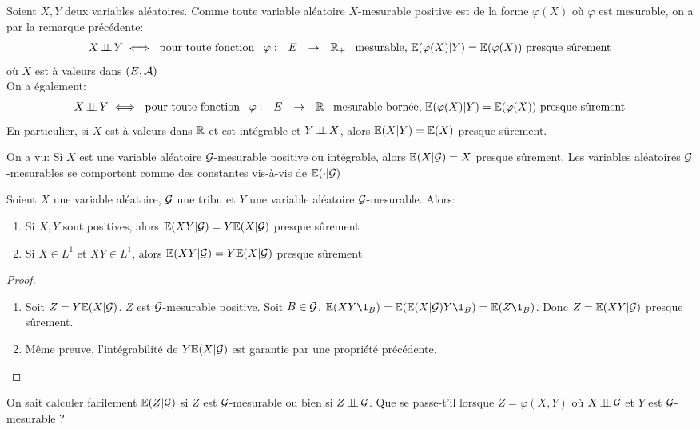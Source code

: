 \documentclass[]{report}
\begin{document}
    \begin{re}{}{}
        Soient $X,Y$ deux variables aléatoires. Comme toute variable aléatoire $X$-mesurable positive est de la forme $\varphi(X)$ où $\varphi$ est mesurable, on a par la remarque précédente:
        \[X\operatorname{\perp \!\!\! \perp} Y\iff \text{ pour toute fonction $\begin{array}{ccccc} \varphi : & E & \to & \mathbb{R}_+ \end{array}$ mesurable, }\mathbb{E}(\varphi(X)|Y)=\mathbb{E}(\varphi(X)) \text{ presque sûrement}\]
        où $X$ est à valeurs dans $(E,\mathcal{A})$\\
        On a également:
        \[X\operatorname{\perp \!\!\! \perp} Y\iff \text{ pour toute fonction $\begin{array}{ccccc} \varphi : & E & \to & \mathbb{R} \end{array}$ mesurable bornée, }\mathbb{E}(\varphi(X)| Y)=\mathbb{E}(\varphi(X))\text{ presque sûrement}\]
        En particulier, si $X$ est à valeurs dans $\mathbb{R}$ et est intégrable et $Y\operatorname{\perp \!\!\! \perp} X$, alors $\mathbb{E}(X|Y)=\mathbb{E}(X)$ presque sûrement.
    \end{re}

On a vu: Si $X$ est une variable aléatoire $\mathcal{G}$-mesurable positive ou intégrable, alors $\mathbb{E}(X|\mathcal{G})=X$ presque sûrement. Les variables aléatoires $\mathcal{G}$-mesurables se comportent comme des constantes vis-à-vis de $\mathbb{E}(\cdot|\mathcal{G})$

    \begin{prop}{}{}
        Soient $X$ une variable aléatoire, $\mathcal{G}$ une tribu et $Y$ une variable aléatoire $\mathcal{G}$-mesurable. Alors:
        \begin{enumerate}
            \item Si $X,Y$ sont positives, alors $\mathbb{E}(XY|\mathcal{G})=Y\mathbb{E}(X|\mathcal{G})$ presque sûrement
            \item Si $X\in L^1$ et $XY\in L^1$, alors $\mathbb{E}(XY|\mathcal{G})=Y\mathbb{E}(X|\mathcal{G})$ presque sûrement
        \end{enumerate}
    \end{prop}

    \begin{proof}
        \begin{enumerate}
            \item Soit $Z=Y\mathbb{E}(X|\mathcal{G})$. $Z$ est $\mathcal{G}$-mesurable positive. Soit $B\in \mathcal{G}$, $\Ea(XY\1_B)=\Ea(\Ea(X|\Gr)Y\1_B)=\Ea(Z\1_B)$. Donc $Z=\mathbb{E}(XY|\mathcal{G})$ presque sûrement.
            \item Même preuve, l'intégrabilité de $Y\mathbb{E}(X|\mathcal{G})$ est garantie par une propriété précédente.\\
        \end{enumerate}
    \end{proof}

    On sait calculer facilement $\mathbb{E}(Z|\mathcal{G})$ si $Z$ est $\mathcal{G}$-mesurable ou bien si $Z\operatorname{\perp \!\!\! \perp} \mathcal{G}$. Que se passe-t'il lorsque $Z=\varphi(X,Y)$ où $X\operatorname{\perp \!\!\! \perp} \mathcal{G}$ et $Y$ est $\mathcal{G}$-mesurable ?
\end{document}

